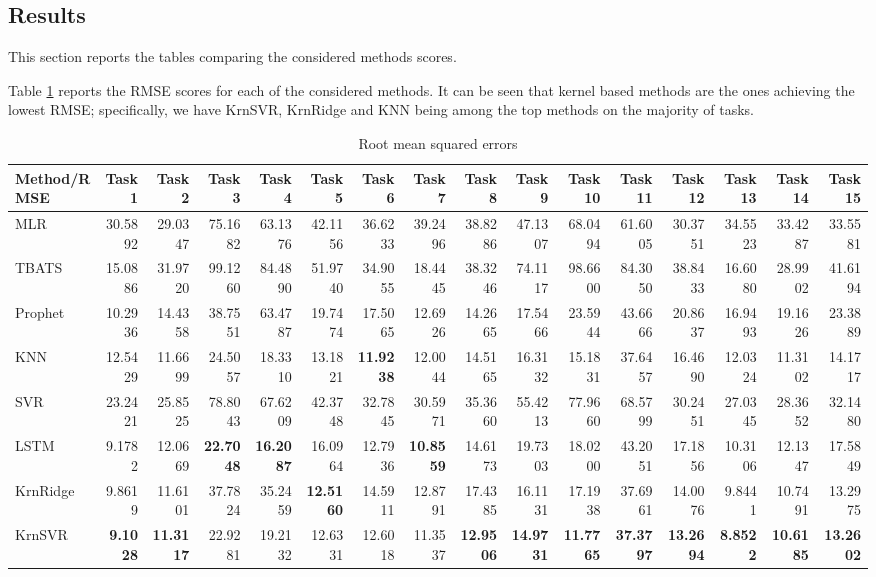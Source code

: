 \subsection{Results}
This section reports the tables comparing the considered methods scores.

Table \ref{tab:point_RMSE} reports the RMSE scores for each of the considered methods. It can be seen that kernel based methods are the ones achieving the lowest RMSE; specifically, we have KrnSVR, KrnRidge and KNN being among the top methods on the majority of tasks.

\begin{table}[!ht]
    \caption{Root mean squared errors}
    \label{tab:point_RMSE}
    \begin{adjustbox}{width=\textwidth}
        \begin{tabular}{lrrrrrrrrrrrrrrr}
            \toprule
            Method/RMSE & Task 1 & Task 2 & Task 3 & Task 4 & Task 5 & Task 6 & Task 7 & Task 8 & Task 9 & Task 10 & Task 11 & Task 12 & Task 13 & Task 14 & Task 15 \\
            \midrule
            MLR & 30.5892 & 29.0347 & 75.1682 & 63.1376 & 42.1156 & 36.6233 & 39.2496 & 38.8286 & 47.1307 & 68.0494 & 61.6005 & 30.3751 & 34.5523 & 33.4287 & 33.5581 \\
            TBATS & 15.0886 & 31.9720 & 99.1260 & 84.4890 & 51.9740 & 34.9055 & 18.4445 & 38.3246 & 74.1117 & 98.6600 & 84.3050 & 38.8433 & 16.6080 & 28.9902 & 41.6194 \\
            Prophet & 10.2936 & 14.4358 & 38.7551 & 63.4787 & 19.7474 & 17.5065 & 12.6926 & 14.2665 & 17.5466 & 23.5944 & 43.6666 & 20.8637 & 16.9493 & 19.1626 & 23.3889 \\
            KNN & 12.5429 & 11.6699 & 24.5057 & 18.3310 & 13.1821 & \textbf{11.9238} & 12.0044 & 14.5165 & 16.3132 & 15.1831 & 37.6457 & 16.4690 & 12.0324 & 11.3102 & 14.1717 \\
            SVR & 23.2421 & 25.8525 & 78.8043 & 67.6209 & 42.3748 & 32.7845 & 30.5971 & 35.3660 & 55.4213 & 77.9660 & 68.5799 & 30.2451 & 27.0345 & 28.3652 & 32.1480 \\
            LSTM & 9.1782 & 12.0669 & \textbf{22.7048} & \textbf{16.2087} & 16.0964 & 12.7936 & \textbf{10.8559} & 14.6173 & 19.7303 & 18.0200 & 43.2051 & 17.1856 & 10.3106 & 12.1347 & 17.5849 \\
            KrnRidge & 9.8619 & 11.6101 & 37.7824 & 35.2459 & \textbf{12.5160} & 14.5911 & 12.8791 & 17.4385 & 16.1131 & 17.1938 & 37.6961 & 14.0076 & 9.8441 & 10.7491 & 13.2975 \\
            KrnSVR & \textbf{9.1028} & \textbf{11.3117} & 22.9281 & 19.2132 & 12.6331 & 12.6018 & 11.3537 & \textbf{12.9506} & \textbf{14.9731} & \textbf{11.7765} & \textbf{37.3797} & \textbf{13.2694} & 
            \textbf{8.8522} & \textbf{10.6185} & \textbf{13.2602} \\
            \bottomrule
            \end{tabular}            
    \end{adjustbox}
\end{table}


